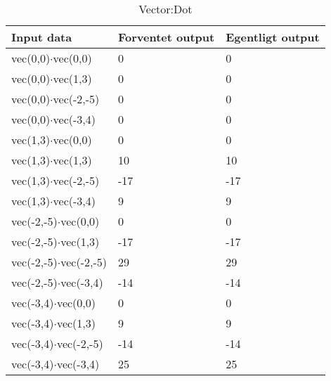 \begin{table}[!h]
	\caption{Vector:Dot}
	\centering
	\begin{tabular}{L L L}
		\hline\hline
		Input data & Forventet output & Egentligt output \\ [0.5ex]
		\hline
		vec(0,0)$\cdot$vec(0,0) & 0 & 0\\
		vec(0,0)$\cdot$vec(1,3) & 0 & 0\\
		vec(0,0)$\cdot$vec(-2,-5) & 0 & 0\\
		vec(0,0)$\cdot$vec(-3,4) & 0 & 0\\
		\hline
		vec(1,3)$\cdot$vec(0,0) & 0 & 0\\
		vec(1,3)$\cdot$vec(1,3) & 10 & 10\\
		vec(1,3)$\cdot$vec(-2,-5) & -17 & -17\\
		vec(1,3)$\cdot$vec(-3,4) & 9 & 9\\
		\hline
		vec(-2,-5)$\cdot$vec(0,0) & 0 & 0\\
		vec(-2,-5)$\cdot$vec(1,3) & -17 & -17\\
		vec(-2,-5)$\cdot$vec(-2,-5) & 29 & 29\\
		vec(-2,-5)$\cdot$vec(-3,4) & -14 & -14\\
		\hline
		vec(-3,4)$\cdot$vec(0,0) & 0 & 0\\
		vec(-3,4)$\cdot$vec(1,3) & 9 & 9\\
		vec(-3,4)$\cdot$vec(-2,-5) & -14 & -14\\
		vec(-3,4)$\cdot$vec(-3,4) & 25 & 25\\
		\hline
	\end{tabular}
\end{table}

